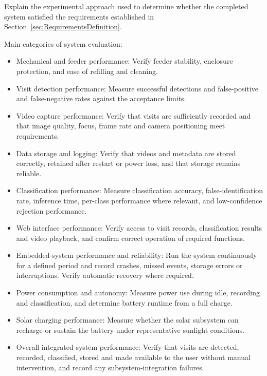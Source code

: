 Explain the experimental approach used to determine whether the completed system satisfied the requirements established in Section~\ref{sec:RequirementsDefinition}.
\par\vspace{6pt}
Main categories of system evaluation:
\begin{itemize}
    \item Mechanical and feeder performance: Verify feeder stability, enclosure protection, and ease of refilling and cleaning.
    
    \item Visit detection performance: Measure successful detections and false-positive and false-negative rates against the acceptance limits.
    
    \item Video capture performance: Verify that visits are sufficiently recorded and that image quality, focus, frame rate and camera positioning meet requirements.
    
    \item Data storage and logging: Verify that videos and metadata are stored correctly, retained after restart or power loss, and that storage remains reliable.
    
    \item Classification performance: Measure classification accuracy, false-identification rate, inference time, per-class performance where relevant, and low-confidence rejection performance.
    
    \item Web interface performance: Verify access to visit records, classification results and video playback, and confirm correct operation of required functions.
    
    \item Embedded-system performance and reliability: Run the system continuously for a defined period and record crashes, missed events, storage errors or interruptions. Verify automatic recovery where required.
    
    \item Power consumption and autonomy: Measure power use during idle, recording and classification, and determine battery runtime from a full charge.
    
    \item Solar charging performance: Measure whether the solar subsystem can recharge or sustain the battery under representative sunlight conditions.
    
    \item Overall integrated-system performance: Verify that visits are detected, recorded, classified, stored and made available to the user without manual intervention, and record any subsystem-integration failures.
\end{itemize}

